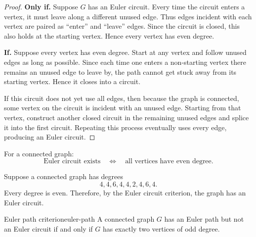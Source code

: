 \begin{proof}
\textbf{Only if.}
Suppose \(G\) has an Euler circuit. Every time the circuit enters a vertex, it must leave along a different unused edge. Thus edges incident with each vertex are paired as ``enter'' and ``leave'' edges. Since the circuit is closed, this also holds at the starting vertex. Hence every vertex has even degree.

\textbf{If.}
Suppose every vertex has even degree. Start at any vertex and follow unused edges as long as possible. Since each time one enters a non-starting vertex there remains an unused edge to leave by, the path cannot get stuck away from its starting vertex. Hence it closes into a circuit.

If this circuit does not yet use all edges, then because the graph is connected, some vertex on the circuit is incident with an unused edge. Starting from that vertex, construct another closed circuit in the remaining unused edges and splice it into the first circuit. Repeating this process eventually uses every edge, producing an Euler circuit.
\end{proof}

\begin{keyformula}[title={Euler circuit test}]
For a connected graph:
\[
\text{Euler circuit exists}
\quad\Longleftrightarrow\quad
\text{all vertices have even degree}.
\]
\end{keyformula}

\begin{center}
\end{center}

\begin{examplebox}[title={Tutorial 8, Question 4}]
Suppose a connected graph has degrees
\[
4,4,6,4,4,2,4,6,4.
\]
Every degree is even. Therefore, by the Euler circuit criterion, the graph has an Euler circuit.
\end{examplebox}

\begin{theorem}{Euler path criterion}{euler-path}
A connected graph \(G\) has an Euler path but not an Euler circuit if and only if \(G\) has exactly two vertices of odd degree.
\end{theorem}

